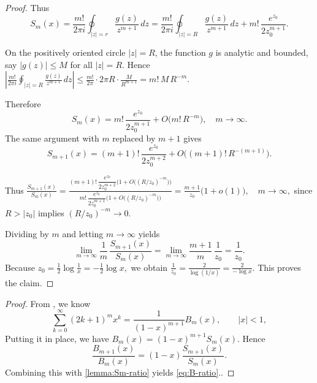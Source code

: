 \documentclass[12pt,twoside]{article}
\newtheorem{lemma}[theorem]{Lemma}
\begin{document}
\begin{proof}
Thus
\[
S_m(x)
= \frac{m!}{2\pi i} \oint_{|z|=r}\frac{g(z)}{z^{m+1}}\,dz
= \frac{m!}{2\pi i} \oint_{|z|=R}\frac{g(z)}{z^{m+1}}\,dz
  + m!\,\frac{e^{z_0}}{2 z_0^{m+1}}.
\]

On the positively oriented circle $|z|=R$, the function $g$ is analytic and bounded, say $|g(z)|\le M$ for all $|z|=R$. Hence
\(\displaystyle
\left|\frac{m!}{2\pi i} \oint_{|z|=R}\frac{g(z)}{z^{m+1}}\,dz\right|
\le \frac{m!}{2\pi} \cdot 2\pi R \cdot \frac{M}{R^{m+1}}
= m!\,M\,R^{-m}.
\)

Therefore
\[
S_m(x)
= m!\,\frac{e^{z_0}}{2 z_0^{m+1}}
  + O\bigl(m!\,R^{-m}\bigr),
\quad m\to\infty.
\]
The same argument with $m$ replaced by $m+1$ gives
\[
S_{m+1}(x)
= (m+1)!\,\frac{e^{z_0}}{2 z_0^{m+2}}
  + O\bigl((m+1)!\,R^{-(m+1)}\bigr).
\]

Thus
\(\displaystyle
\frac{S_{m+1}(x)}{S_m(x)}
= \frac{(m+1)!\,\dfrac{e^{z_0}}{2 z_0^{m+2}}
          \bigl(1 + O\bigl((R/z_0)^{-m}\bigr)\bigr)}
       {m!\,\dfrac{e^{z_0}}{2 z_0^{m+1}}
          \bigl(1 + O\bigl((R/z_0)^{-m}\bigr)\bigr)}
= \frac{m+1}{z_0}\bigl(1 + o(1)\bigr),
\quad m\to\infty,
\)
since $R>|z_0|$ implies $(R/z_0)^{-m}\to 0$.

Dividing by $m$ and letting $m\to\infty$ yields
\[
\lim_{m\to\infty} \frac{1}{m}\,\frac{S_{m+1}(x)}{S_m(x)}
= \lim_{m\to\infty} \frac{m+1}{m}\,\frac{1}{z_0}
= \frac{1}{z_0}.
\]
Because
\(\displaystyle
z_0 = \frac{1}{2}\log\frac{1}{x} = -\frac{1}{2}\log x,
\)
we obtain
\(\displaystyle
\frac{1}{z_0}
= \frac{2}{\log(1/x)}
= \frac{2}{-\log x}.
\)
This proves the claim.
\end{proof}


\begin{proof}

From \cite[Lemma 2.3, Eq.7]{TallaWaffo2026arxiv2602.16761}, we know
\[
  \sum_{k=0}^\infty (2k+1)^m x^k
  = \frac{1}{(1-x)^{m+1}} B_m(x), \qquad |x|<1,
\]
Putting it in place, we have $B_m(x)=(1-x)^{m+1}S_m(x)$. Hence
\[
  \frac{B_{m+1}(x)}{B_m(x)}
  = (1-x)\frac{S_{m+1}(x)}{S_m(x)}.
\]
Combining this with \cref{lemma:Sm-ratio} yields \eqref{eq:B-ratio}..
\end{proof}
\end{document}
